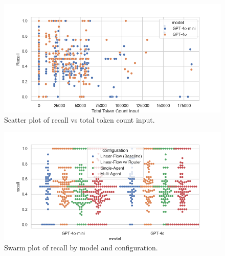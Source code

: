                 \begin{figure}[H]
                    \centering
                    \includegraphics[scale=0.75]{images_exp2/recall/scatter_recall_vs_total_token_count_input.png}
                    \caption{Scatter plot of recall vs total token count input.}
                    \label{fig:scatter_recall_vs_total_token_count_input}
                \end{figure}

                \begin{figure}[H]
                    \centering
                    \includegraphics[scale=0.75]{images_exp2/recall/swarm_recall_by_model_and_configuration.png}
                    \caption{Swarm plot of recall by model and configuration.}
                    \label{fig:swarm_recall_by_model_and_configuration}
                \end{figure}


